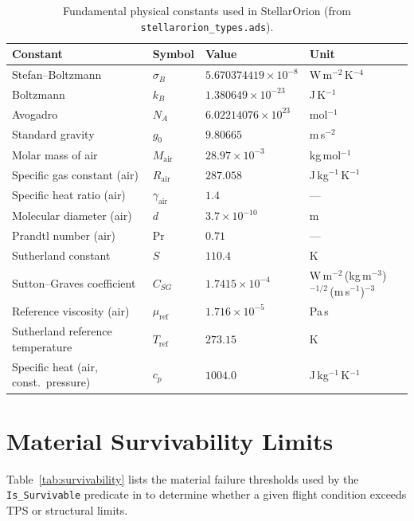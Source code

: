 \begin{table}[H]
\centering
\caption{Fundamental physical constants used in StellarOrion (from \texttt{stellarorion\_types.ads}).}
\label{tab:constants}
\begin{tabularx}{\textwidth}{@{}>{\RaggedRight\arraybackslash}p{} >{\RaggedRight\arraybackslash}p{} >{\RaggedRight\arraybackslash}p{} >{\RaggedRight\arraybackslash}X@{}}
\hline
\textbf{Constant} & \textbf{Symbol} & \textbf{Value} & \textbf{Unit} \\
\hline
Stefan--Boltzmann & $\sigma_B$ & $5.670374419 \times 10^{-8}$ & W\,m$^{-2}$\,K$^{-4}$ \\
Boltzmann & $k_B$ & $1.380649 \times 10^{-23}$ & J\,K$^{-1}$ \\
Avogadro & $N_A$ & $6.02214076 \times 10^{23}$ & mol$^{-1}$ \\
Standard gravity & $g_0$ & $9.80665$ & m\,s$^{-2}$ \\
Molar mass of air & $M_{\text{air}}$ & $28.97 \times 10^{-3}$ & kg\,mol$^{-1}$ \\
Specific gas constant (air) & $R_{\text{air}}$ & $287.058$ & J\,kg$^{-1}$\,K$^{-1}$ \\
Specific heat ratio (air) & $\gamma_{\text{air}}$ & $1.4$ & --- \\
Molecular diameter (air) & $d$ & $3.7 \times 10^{-10}$ & m \\
Prandtl number (air) & $\text{Pr}$ & $0.71$ & --- \\
Sutherland constant & $S$ & $110.4$ & K \\
Sutton--Graves coefficient & $C_{SG}$ & $1.7415 \times 10^{-4}$ & W\,m$^{-2}$\,(kg\,m$^{-3}$)$^{-1/2}$\,(m\,s$^{-1}$)$^{-3}$ \\
Reference viscosity (air) & $\mu_{\text{ref}}$ & $1.716 \times 10^{-5}$ & Pa\,s \\
Sutherland reference temperature & $T_{\text{ref}}$ & $273.15$ & K \\
Specific heat (air, const.\ pressure) & $c_p$ & $1004.0$ & J\,kg$^{-1}$\,K$^{-1}$ \\
\hline
\end{tabularx}
\end{table}

\section{Material Survivability Limits}
\label{sec:survivability_limits}

Table~\ref{tab:survivability} lists the material failure thresholds used by the \texttt{Is\_Survivable} predicate in \texttt{} to determine whether a given flight condition exceeds TPS or structural limits.

